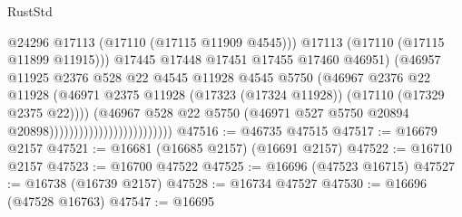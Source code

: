 \begin{lexlean}{RustStd}
\begin{coremodule}
                                                      @24296
                                                      @17113
                                                      (@17110 (@17115 @11909 @4545)))
                                                    @17113
                                                    (@17110 (@17115 @11899 @11915)))
                                                  @17445
                                                  @17448
                                                  @17451
                                                  @17455
                                                  @17460
                                                  @46951)
                                                (@46957
                                                  @11925
                                                  @2376
                                                  @528
                                                  @22
                                                  @4545
                                                  @11928
                                                  @4545
                                                  @5750
                                                  (@46967
                                                    @2376
                                                    @22
                                                    @11928
                                                    (@46971
                                                      @2375
                                                      @11928
                                                      (@17323 (@17324 @11928))
                                                      (@17110 (@17329 @2375 @22))))
                                                  (@46967
                                                    @528
                                                    @22
                                                    @5750
                                                    (@46971
                                                      @527
                                                      @5750
                                                      @20894
                                                      @20898)))))))))))))))))))))))))
@47516 := @46735 @47515
@47517 := @16679 @2157
@47521 := @16681 (@16685 @2157) (@16691 @2157)
@47522 := @16710 @2157
@47523 := @16700 @47522
@47525 := @16696 (@47523 @16715)
@47527 := @16738 (@16739 @2157)
@47528 := @16734 @47527
@47530 := @16696 (@47528 @16763)
@47547 := @16695

\end{coremodule}
\end{lexlean}
